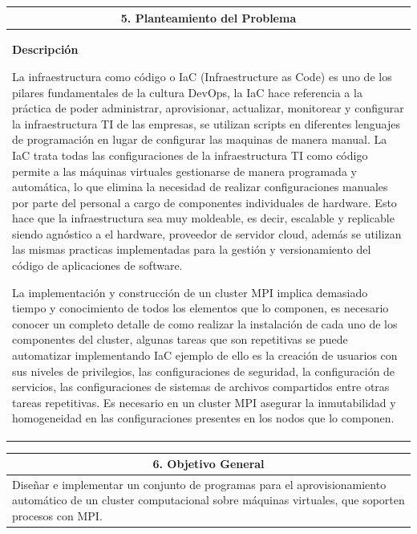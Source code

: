 \documentclass[letter,12pt]{article}
\begin{document}
\begin{center}
\begin{tabular}{|p{15.5cm}|}
\hline
\multicolumn{1}{|c|}{ \textbf{5. Planteamiento del Problema} }\\
\hline
\textbf{Descripción}

La infraestructura como código o IaC (Infraestructure as Code) es uno de los pilares fundamentales de la cultura DevOps, la IaC hace referencia a la práctica de poder administrar, aprovisionar, actualizar, monitorear y configurar la infraestructura TI de las empresas, se utilizan scripts en diferentes lenguajes de programación en lugar de configurar las maquinas de manera manual. La IaC trata todas las configuraciones de la infraestructura TI como código permite a las máquinas virtuales gestionarse de manera programada y automática, lo que elimina la necesidad de realizar configuraciones manuales por parte del personal a cargo de componentes individuales de hardware. Esto hace que la infraestructura sea muy moldeable, es decir, escalable y replicable siendo agnóstico a el hardware, proveedor de servidor cloud, además se utilizan las mismas practicas implementadas para la gestión y versionamiento del código de aplicaciones de software. 

La implementación y construcción de un cluster MPI implica demasiado tiempo y conocimiento de todos los elementos que lo componen, es necesario conocer un completo detalle de como realizar la instalación de cada uno de los componentes del cluster, algunas tareas que son repetitivas se puede automatizar implementando IaC ejemplo de ello es la creación de usuarios con sus niveles de privilegios, las configuraciones de seguridad, la configuración de servicios, las configuraciones de sistemas de archivos compartidos entre otras tareas repetitivas. Es necesario en un cluster MPI asegurar la inmutabilidad y homogeneidad en las configuraciones presentes en los nodos que lo componen.

\hline
\end{tabular}
\end{center}

\begin{center}
\begin{tabular}{|p{15.5cm}|}
\hline
\multicolumn{1}{|c|}{ \textbf{6. Objetivo General}}\\
\hline
Diseñar e implementar un conjunto de programas para el aprovisionamiento automático de un cluster computacional sobre máquinas virtuales, que soporten procesos con MPI.
\\
\hline
\end{tabular}
\end{center}
\end{document}
